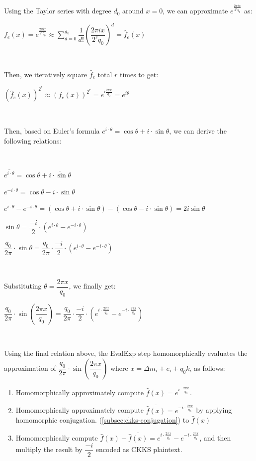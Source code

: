 Using the Taylor series with degree $d_0$ around $x = 0$, we can approximate $e^{\frac{2\pi i x}{2^r q_0}}$ as: 

$f_e(x) = e^{\frac{2\pi i x}{2^r q_0}} \approx \sum\limits_{d=0}^{d_0}\dfrac{1}{d!}\left(\dfrac{2\pi i x}{2^rq_0}\right)^d = \hat{f}_e(x)$

$ $

Then, we iteratively square $\hat{f}_e$ total $r$ times to get:

$(\hat{f}_e(x))^{2^r} \approx (f_e(x))^{2^r} = e^{i\frac{2\pi x}{q_0}} = e^{i\theta}$

$ $

Then, based on Euler's formula $e^{i\cdot \theta} = \cos \theta + i \cdot \sin \theta$, we can derive the following relations:

$ $

$\overline{e^{i\cdot \theta}} = \cos \theta + \overline{i \cdot \sin \theta} $

$ e^{-i\cdot \theta} = \cos \theta - i \cdot \sin \theta$

$ e^{i\cdot \theta} - e^{-i\cdot \theta} = (\cos \theta + i \cdot \sin \theta) - (\cos \theta - i \cdot \sin \theta) = 2i\sin \theta$

$\sin \theta = \dfrac{-i}{2} \cdot (e^{i\cdot \theta} - e^{-i\cdot \theta})$

$\dfrac{q_0}{2\pi}\cdot \sin \theta = \dfrac{q_0}{2\pi}\cdot \dfrac{-i}{2} \cdot (e^{i\cdot \theta} - e^{-i\cdot \theta})$

$ $

Substituting $\theta = \dfrac{2\pi x}{q_0}$, we finally get: 

$\dfrac{q_0}{2\pi}\cdot \sin \left(\dfrac{2\pi x}{q_0}\right) = \dfrac{q_0}{2\pi}\cdot \dfrac{-i}{2} \cdot (e^{i\cdot \frac{2\pi x}{q_0}} - e^{-i\cdot \frac{2\pi x}{q_0}})$

$ $

Using the final relation above, the \textsf{EvalExp} step homomorphically evaluates the approximation of $\dfrac{q_0}{2\pi}\cdot \sin \left(\dfrac{2\pi x}{q_0}\right)$ where $x = \Delta m_i + e_i + q_0k_i$ as follows: 

\begin{enumerate}
\item Homomorphically approximately compute $\hat{f}(x) = e^{i\cdot \frac{2\pi x}{q_0}}$.
\item Homomorphically approximately compute $\overline{\hat{f}(x)} = e^{-i\cdot \frac{2\pi x}{q_0}}$ by applying homomorphic conjugation. (\autoref{subsec:ckks-conjugation}) to $\hat{f}(x)$
\item Homomorphically compute $\hat{f}(x) - \overline{\hat{f}(x)} = e^{i\cdot \frac{2\pi x}{q_0}} -  e^{-i\cdot \frac{2\pi x}{q_0}}$, and then multiply the result by $\dfrac{-i}{2}$ encoded as CKKS plaintext.
\end{enumerate}

